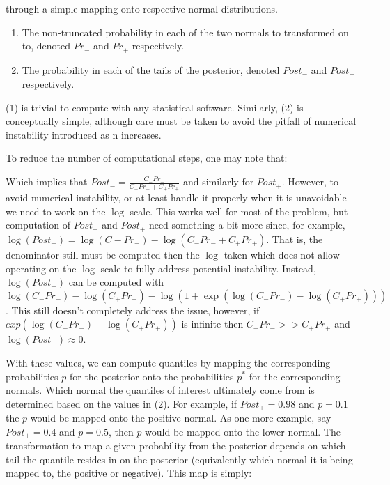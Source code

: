 through a simple mapping onto respective normal distributions.

\begin{enumerate}
\item The non-truncated probability in each of the two normals to transformed on to, denoted $Pr_{-}$ and $Pr_{+}$ respectively.
\item The probability in each of the tails of the posterior, denoted $Post_{-}$ and $Post_{+}$ respectively.
\end{enumerate}

(1) is trivial to compute with any statistical software. Similarly, (2) is conceptually simple, although care must be taken to avoid the pitfall of numerical instability introduced as n increases.

To reduce the number of computational steps, one may note that:


Which implies that $Post_- = \frac{C_{-} Pr_{-}}{C_{-} Pr_{-} + C_{+} Pr_{+}}$ and similarly for $Post_+$. However, to avoid numerical instability, or at least handle it properly when it is unavoidable we need to work on the $\log$ scale. This works well for most of the problem, but computation of $Post_-$ and $Post_+$ need something a bit more since, for example, $\log(Post_-) = \log(C{-}Pr_{-}) - \log(C_{-} Pr_{-} + C_{+} Pr_{+})$. That is, the denominator still must be computed then the $\log$ taken which does not allow operating on the $\log$ scale to fully address potential instability. Instead, $\log(Post_-)$ can be computed with $\log(C_-Pr_-) -  \log(C_+Pr_+) - \log(1 + \exp(\log(C_-Pr_-) -  \log(C_+Pr_+)))$. This still doesn't completely address the issue, however, if $exp(\log(C_-Pr_-) -  \log(C_+Pr_+))$ is infinite then $C_-Pr_- >> C_+Pr_+$ and $\log(Post_-) \approx 0$.

With these values, we can compute quantiles by mapping the corresponding probabilities $p$ for the posterior onto the probabilities $p^*$ for the corresponding normals. Which normal the quantiles of interest ultimately come from is determined based on the values in (2). For example, if $Post_{+} = 0.98$ and $p = 0.1$ the $p$ would be mapped onto the positive normal. As one more example, say $Post_{+} = 0.4$ and $p = 0.5$, then $p$ would be mapped onto the lower normal. The transformation to map a given probability from the posterior depends on which tail the quantile resides in on the posterior (equivalently which normal it is being mapped to, the positive or negative). This map is simply:

